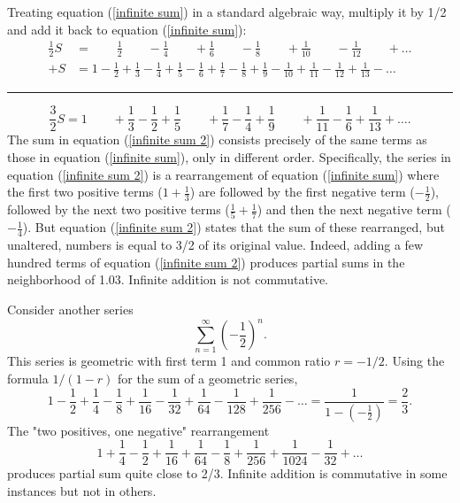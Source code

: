 \documentclass{article}
\begin{document}
            Treating equation (\ref{infinite sum}) in a standard algebraic way, multiply it by 1/2 and add it back to equation (\ref{infinite sum}):
            \begin{align*}
                    \frac{1}{2}S & = \qquad \frac{1}{2} \qquad - \frac{1}{4} \qquad + \frac{1}{6} \qquad - \frac{1}{8} \qquad + \frac{1}{10} \qquad - \frac{1}{12} \qquad + \dots\\
                +S & = 1   -\frac{1}{2} +\frac{1}{3} -\frac{1}{4} +\frac{1}{5} -\frac{1}{6} +\frac{1}{7} -\frac{1}{8} +\frac{1}{9} -\frac{1}{10} +\frac{1}{11} -\frac{1}{12} +\frac{1}{13} -\dots
            \end{align*}
            \hrule
            \begin{equation}
                \frac{3}{2}S = 1 \qquad +\frac{1}{3} - \frac{1}{2} + \frac{1}{5} \qquad + \frac{1}{7} - \frac{1}{4} + \frac{1}{9} \qquad + \frac{1}{11} - \frac{1}{6} + \frac{1}{13} + \dots.
            \label{infinite sum 2}
            \end{equation}
            The sum in equation (\ref{infinite sum 2}) consists precisely of the same terms as those in equation (\ref{infinite sum}), only in different order. Specifically, the series in equation (\ref{infinite sum 2}) is a rearrangement of equation (\ref{infinite sum}) where the first two positive terms ($1+\frac{1}{3}$) are followed by the first negative term ($-\frac{1}{2}$), followed by the next two positive terms ($\frac{1}{5}+\frac{1}{7}$) and then the next negative term ($-\frac{1}{4}$). But equation (\ref{infinite sum 2}) states that the sum of these rearranged, but unaltered, numbers is equal to 3/2 of its original value. Indeed, adding a few hundred terms of equation (\ref{infinite sum 2}) produces partial sums in the neighborhood of 1.03. Infinite addition is not commutative.
            
            Consider another series
            \begin{equation*}
                \sum_{n=1}^\infty (-\frac{1}{2})^n.
            \end{equation*}
            This series is geometric with first term 1 and common ratio $r=-1/2$. Using the formula $1/(1-r)$ for the sum of a geometric series,
            \begin{equation*}
                1-\frac{1}{2}+\frac{1}{4}-\frac{1}{8}+\frac{1}{16}-\frac{1}{32}+\frac{1}{64}-\frac{1}{128}+\frac{1}{256}-\dots = \frac{1}{1-(-\frac{1}{2})} = \frac{2}{3}.
            \end{equation*}
            The "two positives, one negative" rearrangement
            \begin{equation*}
                1+\frac{1}{4}-\frac{1}{2}+\frac{1}{16}+\frac{1}{64}-\frac{1}{8}+\frac{1}{256}+\frac{1}{1024}-\frac{1}{32}+\dots
            \end{equation*}
            produces partial sum quite close to 2/3. Infinite addition is commutative in some instances but not in others.
\end{document}
